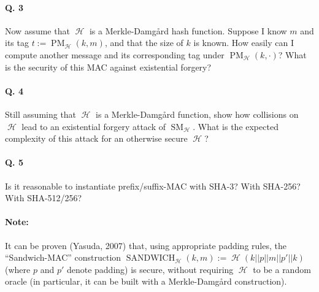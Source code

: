 \documentclass[11pt,a4paper]{article}
\DeclareMathOperator\hash{\mathcal{H}}
\DeclareMathOperator\pmm{\mathrm{PM}}
\DeclareMathOperator\smm{\mathrm{SM}}
\DeclareMathOperator\sand{\mathrm{SANDWICH}}
\begin{document}
\paragraph{Q. 3} Now assume that $\hash$ is a Merkle-Damg\aa rd hash function. Suppose I know $m$ and its tag $t := \pmm_{\hash}(k, m)$,
and that the size of $k$ is known. How easily can I compute another message and its corresponding tag under $\pmm_{\hash}(k, \cdot)$? What is the security of
this MAC against existential forgery?

\paragraph{Q. 4} Still assuming that $\hash$ is a Merkle-Damg\aa rd function, show how collisions on $\hash$ lead to an existential forgery attack
of $\smm_{\hash}$. What is the expected complexity of this attack for an otherwise secure $\hash$? 

\paragraph{Q. 5} Is it reasonable to instantiate prefix/suffix-MAC with SHA-3? With SHA-256? With SHA-512/256?

\paragraph{Note:} It can be proven (Yasuda, 2007) that, using appropriate padding rules, the ``Sandwich-MAC'' construction $\sand_{\hash}(k,m) := \hash(k||p||m||p'||k)$
(where $p$ and $p'$ denote padding) is secure, without requiring $\hash$ to be a random oracle (in particular, it can be built with a Merkle-Damg\aa rd construction).
\end{document}
